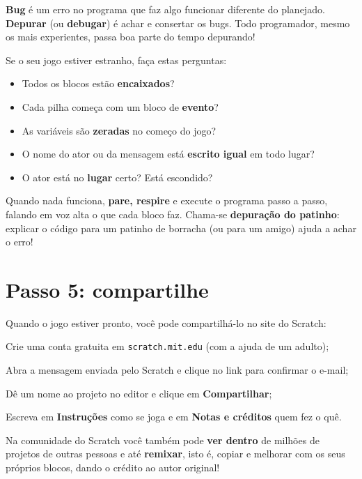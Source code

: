 \begin{vocabulario}
\textbf{Bug} é um erro no programa que faz algo funcionar diferente do planejado. \textbf{Depurar} (ou \textbf{debugar}) é achar e consertar os bugs. Todo programador, mesmo os mais experientes, passa boa parte do tempo depurando!
\end{vocabulario}

Se o seu jogo estiver estranho, faça estas perguntas:

\begin{itemize}
\item Todos os blocos estão \textbf{encaixados}?
\item Cada pilha começa com um bloco de \textbf{evento}?
\item As variáveis são \textbf{zeradas} no começo do jogo?
\item O nome do ator ou da mensagem está \textbf{escrito igual} em todo lugar?
\item O ator está no \textbf{lugar} certo? Está escondido?
\end{itemize}

\begin{cuidado}
Quando nada funciona, \textbf{pare, respire} e execute o programa passo a passo, falando em voz alta o que cada bloco faz. Chama-se \textbf{depuração do patinho}: explicar o código para um patinho de borracha (ou para um amigo) ajuda a achar o erro!
\end{cuidado}

\section{Passo 5: compartilhe}

Quando o jogo estiver pronto, você pode compartilhá-lo no site do Scratch:

\begin{passos}
\item Crie uma conta gratuita em \texttt{scratch.mit.edu} (com a ajuda de um adulto);
\item Abra a mensagem enviada pelo Scratch e clique no link para confirmar o e-mail;
\item Dê um nome ao projeto no editor e clique em \textbf{Compartilhar};
\item Escreva em \textbf{Instruções} como se joga e em \textbf{Notas e créditos} quem fez o quê.
\end{passos}

\begin{curiosidade}
Na comunidade do Scratch você também pode \textbf{ver dentro} de milhões de projetos de outras pessoas e até \textbf{remixar}, isto é, copiar e melhorar com os seus próprios blocos, dando o crédito ao autor original!
\end{curiosidade}

